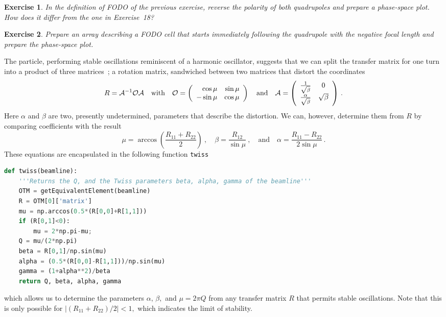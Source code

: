 \documentclass{article}
\newtheorem{exercise}{Exercise}
\begin{document}
\begin{exercise}
In the definition of FODO of the previous exercise, reverse the polarity of both quadrupoles and prepare a phase-space plot. How does it differ from the one in Exercise~18?
\end{exercise}
  
\begin{exercise}
Prepare an array describing a FODO cell that starts immediately following the quadrupole with the negative focal length and prepare the phase-space plot. 
\end{exercise}

The particle, performing stable oscillations reminiscent of a harmonic oscillator, 
suggests that we can split the transfer matrix for one turn into a product of three 
matrices~\cite{VZAPB}; a rotation matrix, sandwiched between two matrices that distort 
the coordinates
\begin{equation}\label{eq:RAOR}
R={\cal A}^{-1}{\cal O}{\cal A}
\quad\mathrm{with}\quad
{\cal O}=\left(\begin{array}{rr} \cos\mu &\sin\mu\\ -\sin\mu & \cos\mu\end{array}\right)
\quad\mathrm{and}\quad
{\cal A}=
\left(\begin{array}{cc} \frac{1}{\sqrt{\beta}} & 0 \\ 
\frac{\alpha}{\sqrt{\beta}} & \sqrt{\beta}\end{array}\right)\, .
\end{equation}
Here $\alpha$ and $\beta$ are two, presently undetermined, parameters that describe the 
distortion. We can, however, determine them from $R$ by comparing coefficients with
the result 
\begin{equation}\label{eq:betaR}
\mu=\arccos\left(\frac{R_{11}+R_{22}}{2}\right)\ ,
\quad \beta=\frac{R_{12}}{\sin\mu}\ ,
\quad\mathrm{and}\quad \alpha=\frac{R_{11}-R_{22}}{2\sin\mu}\, .
\end{equation} 
These equations are encapsulated in the following function {\tt twiss}

\begin{lstlisting}[language=Python]
def twiss(beamline):
    '''Returns the Q, and the Twiss parameters beta, alpha, gamma of the beamline'''
    OTM = getEquivalentElement(beamline)
    R = OTM[0]['matrix']
    mu = np.arccos(0.5*(R[0,0]+R[1,1]))
    if (R[0,1]<0): 
        mu = 2*np.pi-mu;
    Q = mu/(2*np.pi)
    beta = R[0,1]/np.sin(mu)
    alpha = (0.5*(R[0,0]-R[1,1]))/np.sin(mu)
    gamma = (1+alpha**2)/beta
    return Q, beta, alpha, gamma
\end{lstlisting}
which allows us to determine the parameters $\alpha,\, \beta,$ and $\mu=2\pi Q$ from any
transfer matrix $R$ that permits stable oscillations. Note that this is only possible
for $\vert (R_{11}+R_{22})/2\vert <1,$ which indicates the limit of stability.
\end{document}
